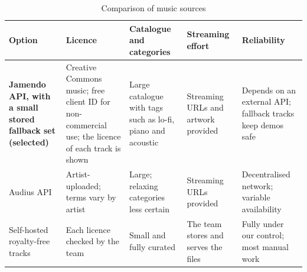 \begin{longtable}{|>{\raggedright\arraybackslash}p{3.2cm}|>{\raggedright\arraybackslash}p{2.9cm}|>{\raggedright\arraybackslash}p{2.9cm}|>{\raggedright\arraybackslash}p{2.7cm}|>{\raggedright\arraybackslash}p{2.7cm}|}

\caption{Comparison of music sources}\label{tab:tech-music}\\

\hline

\textbf{Option} & \textbf{Licence} & \textbf{Catalogue and categories} & \textbf{Streaming effort} & \textbf{Reliability} \\ \hline

\textbf{Jamendo API, with a small stored fallback set (selected)} & Creative Commons music; free client ID for non-commercial use; the licence of each track is shown &

Large catalogue with tags such as lo-fi, piano and acoustic &

Streaming URLs and artwork provided &

Depends on an external API; fallback tracks keep demos safe \\ \hline

Audius API & Artist-uploaded; terms vary by artist &

Large; relaxing categories less certain &

Streaming URLs provided &

Decentralised network; variable availability \\ \hline

Self-hosted royalty-free tracks & Each licence checked by the team &

Small and fully curated &

The team stores and serves the files &

Fully under our control; most manual work \\ \hline

\end{longtable}

